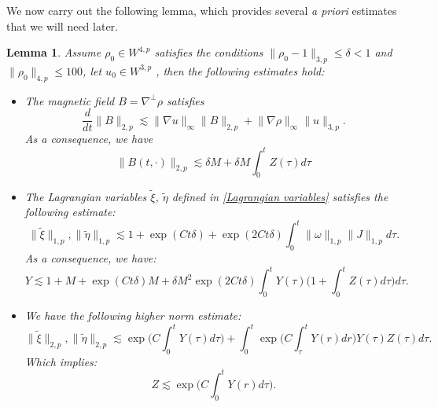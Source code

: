\documentclass[12pt,letterpaper]{article}
\newtheorem{lem}[thm]{Lemma}
\theoremstyle{plain}
\begin{document}
We now carry out the following lemma, which provides several \textit{a priori} estimates that we will need later.
\begin{lem}\label{Apriori Estimate for new Variables}
    Assume  $\rho_0\in W^{4,p}$ satisfies the conditions $\lVert \rho_0-1\rVert_{3,p}\le \delta<1$ and $\lVert\rho_0\rVert_{4,p}\le 100$, let $u_0\in W^{3,p}$ , then the following estimates hold:
    \begin{itemize}
        \item [(I)] The magnetic field $B=\nabla^\perp\rho$ satisfies
        \begin{equation}\label{Magnetic field Estimate}
         \frac{d}{dt} \lVert B\rVert_{2,p}\lesssim \lVert\nabla u\rVert_\infty \lVert B\rVert_{2,p}+ \lVert\nabla\rho\rVert_\infty\lVert u\rVert_{3,p}.     
        \end{equation}
        As a consequence, we have
        \begin{equation}\label{Magnetic field Estimate II}
         \lVert B(t,\cdot)\rVert_{2,p}\lesssim \delta M+\delta M\int_0^tZ(\tau)d\tau
        \end{equation}
        \item[(II)]     The Lagrangian variables $\tilde\xi$, $\tilde\eta$ defined in \eqref{Lagrangian variables} satisfies the following estimate:
    \begin{equation}\label{lagrangian variable estimates}
      \lVert\tilde\xi\rVert_{1,p},\lVert\tilde\eta\rVert_{1,p}\lesssim  1+\exp(Ct\delta)+\exp(2Ct\delta)\int_0^t\lVert\omega\rVert_{1,p}\lVert J\rVert_{1,p}d\tau. 
    \end{equation}
    As a consequence, we have:
    \begin{equation}\label{Elsasser variable estimates}
      Y\lesssim 1+M+\exp(Ct\delta)M+ \delta M^2\exp(2Ct\delta)\int_0^t Y(\tau)\bigg(1+\int_0^t Z(\tau)d\tau\bigg)d\tau.
    \end{equation}
    \item[(III)] We have the following higher norm estimate:
    \begin{equation}\label{higher lagrangian variable estimates}
     \lVert\tilde\xi\rVert_{2,p},\lVert\tilde\eta\rVert_{2,p}\lesssim  \exp\bigg(C\int_0^t Y(\tau)d\tau\bigg)+\int_0^t \exp\bigg(C\int_\tau^t Y(r)dr\bigg)Y(\tau)Z(\tau)d\tau  . 
    \end{equation}
    Which implies:
     \begin{equation}\label{higher Elsasser variable estimates}
      Z\lesssim \exp\bigg(C\int_0^t Y(r)d\tau\bigg).
    \end{equation}
    \end{itemize}

\end{lem}
\end{document}

